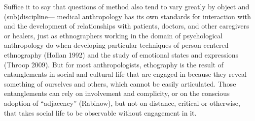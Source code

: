\documentclass[10pt,letter,oneside]{scrartcl}
\let\footnote=\endnote
\begin{document}

  
Suffice it to say that questions of method also tend to vary greatly by object 
and (sub)discipline--- medical anthropology has its own standards for
interaction with and the development of relationships with patients,
doctors, and other caregivers or healers, just as ethnographers working in
the domain of psychological anthropology do when developing particular
techniques of person-centered ethnography (Hollan 1992) and the study of 
emotional states and expressions (Throop 2009). But for most anthropologists, 
ethography is the result of entanglements in social and cultural life that are 
engaged in because they reveal something of ourselves and others, which
cannot be easily articulated. Those entanglements can rely on involvement 
and complicity, or on the conscious adoption of ``adjacency'' (Rabinow), 
but not on distance, critical or otherwise, that takes social life to be 
observable without engagement in it.
\end{document}
